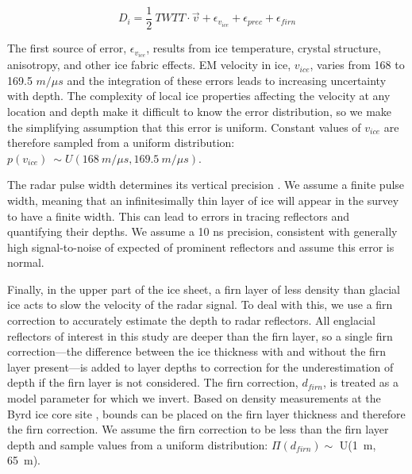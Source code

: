 \begin{equation}\label{deptheqn}
D_i = \frac{1}{2}~TWTT \cdot \vec{v} + \epsilon_{v_{ice}} + \epsilon_{prec} + \epsilon_{firn}
\end{equation}

The first source of error, $\epsilon_{v_{ice}}$, results from ice temperature, crystal structure, anisotropy, and other ice fabric effects. EM velocity in ice, $v_{ice}$, varies from 168 to 169.5 $m/{\mu}s$ \citep{fujita2000} and the integration of these errors leads to increasing uncertainty with depth.  The complexity of local ice properties affecting the velocity at any location and depth make it difficult to know the error distribution, so we make the simplifying assumption that this error is uniform. Constant values of $v_{ice}$ are therefore sampled from a uniform distribution: $p(v_{ice}) ~\sim U(168~m/{\mu}s,169.5~m/{\mu}s)$.

The radar pulse width determines its vertical precision \citep{millar1982}. We assume a finite pulse width, meaning that an infinitesimally thin layer of ice will appear in the survey to have a finite width. This can lead to errors in tracing reflectors and quantifying their depths. We assume a 10 ns precision, consistent with generally high signal-to-noise of expected of prominent reflectors and assume this error is normal.

Finally, in the upper part of the ice sheet, a firn layer of less density than glacial ice acts to slow the velocity of the radar signal. To deal with this, we use a firn correction to accurately estimate the depth to radar reflectors. All englacial reflectors of interest in this study are deeper than the firn layer, so a single firn correction---the difference between the ice thickness with and without the firn layer present---is added to layer depths to correction for the underestimation of depth if the firn layer is not considered. The firn correction, $d_{firn}$, is treated as a model parameter for which we invert. Based on density measurements at the Byrd ice core site \citep{gow1970}, bounds can be placed on the firn layer thickness and therefore the firn correction. We assume the firn correction to be less than the firn layer depth and sample values from a uniform distribution: $\Pi(d_{firn})\sim$ U(1~m, 65~m). %



